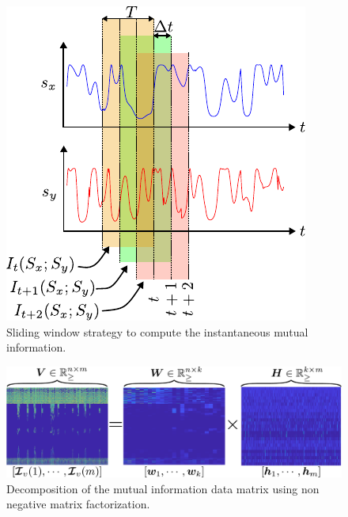 \begin{figure}[!th]
	\begin{center}
		\hspace*{\fill}
		\includegraphics[width=0.99\columnwidth]{sliding_window_mi.pdf}
		\hspace*{\fill}
	\end{center}
	\caption{\label{fig:mi_sliding_window_mi} Sliding window strategy to compute the instantaneous mutual information.}
\end{figure}

\begin{figure}[!th]
	\centering
	\includegraphics[width=0.99\columnwidth]{fig/nnmf_concept.pdf}
	\caption{Decomposition of the mutual information data matrix using non negative matrix factorization.}
	\label{fig:nnmf}
\end{figure}

